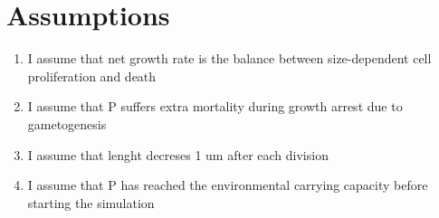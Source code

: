 \documentclass[a4paper,oneside]{book}
\begin{document}
    \begin{table}[h]
      \centering
      {%
      \begin{subtable}{.5\textwidth}\centering\scriptsize
        {}
        \caption{$\alpha, r_p:r_{f1}, \text{with } d = 0.2$}
      \end{subtable}
      \begin{subtable}{.5\textwidth}\centering\scriptsize
        {}
        \caption{$\alpha, r_p:r_{f1}, \text{with } d = 0.4$}
      \end{subtable}
      \begin{subtable}{.5\textwidth}\centering\scriptsize
        {}
        \caption{$\alpha, r_p:r_{f1}, \text{with } d = 0.6$}
      \end{subtable}

      \vspace{0.5cm}
      \begin{subtable}{.5\textwidth}\centering\scriptsize
        {}
        \caption{$\alpha, r_p:r_{f1}$}
      \end{subtable}
       \caption{Tabular data for different parameter 2D subspaces and growth arrest duration of 5 days}\label{tbl2}
     }
    \end{table}
%
  \section*{Assumptions} 
    \begin{enumerate}
      \item I assume that net growth rate is the balance between size-dependent cell proliferation and death
      \item I assume that P suffers extra mortality during growth arrest due to gametogenesis
      \item I assume that lenght decreses 1 um after each division
      \item I assume that P has reached the environmental carrying capacity before starting the simulation
    \end{enumerate}
\end{document}
